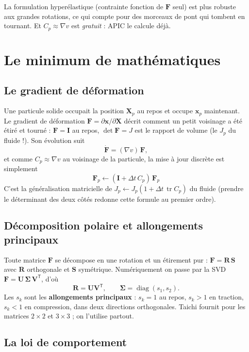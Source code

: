 \documentclass[11pt,a4paper]{article}
\newcommand{\code}[1]{\texttt{\detokenize{#1}}}
\newcommand{\bm}[1]{\boldsymbol{#1}}
\newcommand{\tr}{\operatorname{tr}}
\begin{document}
La formulation hyperélastique (contrainte fonction de $\mathbf F$ seul) est plus robuste aux
grandes rotations, ce qui compte pour des morceaux de pont qui tombent en tournant. Et
$C_p \approx \nabla v$ est \emph{gratuit} : APIC le calcule déjà.

\section{Le minimum de mathématiques}

\subsection{Le gradient de déformation}
\label{sec:F}

Une particule solide occupait la position $\mathbf X_p$ au repos et occupe $\mathbf x_p$ maintenant.
Le gradient de déformation $\mathbf F = \partial\mathbf x/\partial\mathbf X$ décrit comment un petit
voisinage a été étiré et tourné : $\mathbf F = \mathbf I$ au repos, $\det\mathbf F = J$ est le rapport
de volume (le $J_p$ du fluide !). Son évolution suit
\[
  \dot{\mathbf F} = (\nabla v)\,\mathbf F,
\]
et comme $C_p \approx \nabla v$ au voisinage de la particule, la mise à jour discrète est simplement
\[
  \boxed{\;\mathbf F_p \leftarrow (\mathbf I + \Delta t\, C_p)\,\mathbf F_p\;}
\]
C'est la généralisation matricielle de $J_p \leftarrow J_p(1 + \Delta t\,\tr C_p)$ du fluide
(prendre le déterminant des deux côtés redonne cette formule au premier ordre).

\subsection{Décomposition polaire et allongements principaux}

Toute matrice $\mathbf F$ se décompose en une rotation et un étirement pur : $\mathbf F = \mathbf R\,\mathbf S$
avec $\mathbf R$ orthogonale et $\mathbf S$ symétrique. Numériquement on passe par la SVD
$\mathbf F = \mathbf U\,\bm\Sigma\,\mathbf V^{\mathsf T}$, d'où
\[
  \mathbf R = \mathbf U\mathbf V^{\mathsf T},\qquad
  \bm\Sigma = \operatorname{diag}(s_1, s_2).
\]
Les $s_k$ sont les \textbf{allongements principaux} : $s_k = 1$ au repos, $s_k > 1$ en traction,
$s_k < 1$ en compression, dans deux directions orthogonales. Taichi fournit \code{ti.svd(F)} pour
les matrices $2\times2$ et $3\times3$ ; on l'utilise partout.

\subsection{La loi de comportement}
\label{sec:loi}
\end{document}
